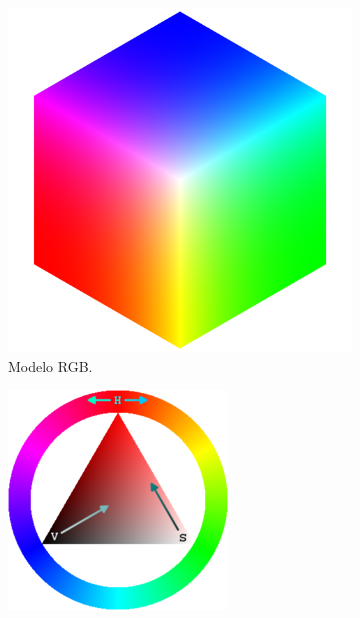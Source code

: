 \begin{figure}[htbp!]
	\centering
	\begin{subfigure}[h]{0.25\textwidth}
		\centering
		\includegraphics[width=\textwidth]{./Figuras/RGB}
		\caption{Modelo RGB.}
		\label{fig:RGB}
	\end{subfigure}
	\begin{subfigure}[h]{0.25\textwidth}
		\includegraphics[width=\textwidth]{./Figuras/HSV}

\end{subfigure}
\end{figure}
